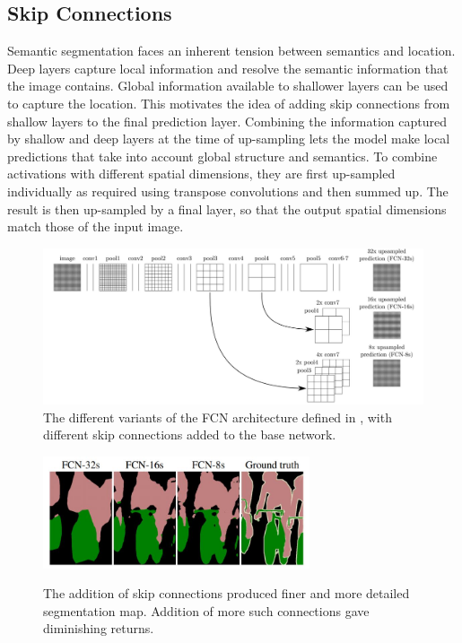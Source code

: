 \documentclass[12pt, a4paper]{report}
\begin{document}
\subsection{Skip Connections}
Semantic segmentation faces an inherent tension between semantics and location. Deep layers capture local information and resolve the semantic information that the image contains. Global information available to shallower layers can be used to capture the location. This motivates the idea of adding skip connections from shallow layers to the final prediction layer. Combining the information captured by shallow and deep layers at the time of up-sampling lets the model make local predictions that take into account global structure and semantics. To combine activations with different spatial dimensions, they are first up-sampled individually as required using transpose convolutions and then summed up. The result is then up-sampled by a final layer, so that the output spatial dimensions match those of the input image.\cite{long2015fully}
\begin{figure}[h]
\centering
\includegraphics[width=\textwidth]{fcn2.jpg}
\caption{The different variants of the FCN architecture defined in \cite{long2015fully}, with different skip connections added to the base network.}
\end{figure}
\begin{figure}[h]
\centering
\includegraphics[width=0.7\textwidth]{fcn3.jpg}
\caption{The addition of skip connections produced finer and more detailed segmentation map. Addition of more such connections gave diminishing returns.}
\cite{long2015fully}
\end{figure}
\end{document}
